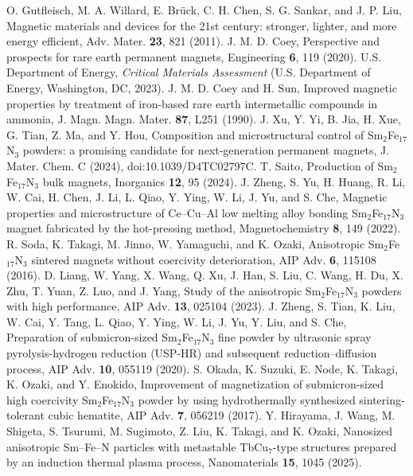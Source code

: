 \documentclass[10pt,twocolumn,letterpaper]{article}
\begin{document}
 O. Gutfleisch, M. A. Willard, E. Br\"uck, C. H. Chen, S. G. Sankar, and J. P. Liu, Magnetic materials and devices for the 21st century: stronger, lighter, and more energy efficient, Adv. Mater. \textbf{23}, 821 (2011).
 J. M. D. Coey, Perspective and prospects for rare earth permanent magnets, Engineering \textbf{6}, 119 (2020).
 U.S. Department of Energy, \textit{Critical Materials Assessment} (U.S. Department of Energy, Washington, DC, 2023).
 J. M. D. Coey and H. Sun, Improved magnetic properties by treatment of iron-based rare earth intermetallic compounds in ammonia, J. Magn. Magn. Mater. \textbf{87}, L251 (1990).
 J. Xu, Y. Yi, B. Jia, H. Xue, G. Tian, Z. Ma, and Y. Hou, Composition and microstructural control of Sm$_2$Fe$_{17}$N$_3$ powders: a promising candidate for next-generation permanent magnets, J. Mater. Chem. C (2024), doi:10.1039/D4TC02797C.
 T. Saito, Production of Sm$_2$Fe$_{17}$N$_3$ bulk magnets, Inorganics \textbf{12}, 95 (2024).
 J. Zheng, S. Yu, H. Huang, R. Li, W. Cai, H. Chen, J. Li, L. Qiao, Y. Ying, W. Li, J. Yu, and S. Che, Magnetic properties and microstructure of Ce--Cu--Al low melting alloy bonding Sm$_2$Fe$_{17}$N$_3$ magnet fabricated by the hot-pressing method, Magnetochemistry \textbf{8}, 149 (2022).
 R. Soda, K. Takagi, M. Jinno, W. Yamaguchi, and K. Ozaki, Anisotropic Sm$_2$Fe$_{17}$N$_3$ sintered magnets without coercivity deterioration, AIP Adv. \textbf{6}, 115108 (2016).
 D. Liang, W. Yang, X. Wang, Q. Xu, J. Han, S. Liu, C. Wang, H. Du, X. Zhu, T. Yuan, Z. Luo, and J. Yang, Study of the anisotropic Sm$_2$Fe$_{17}$N$_3$ powders with high performance, AIP Adv. \textbf{13}, 025104 (2023).
 J. Zheng, S. Tian, K. Liu, W. Cai, Y. Tang, L. Qiao, Y. Ying, W. Li, J. Yu, Y. Liu, and S. Che, Preparation of submicron-sized Sm$_2$Fe$_{17}$N$_3$ fine powder by ultrasonic spray pyrolysis-hydrogen reduction (USP-HR) and subsequent reduction--diffusion process, AIP Adv. \textbf{10}, 055119 (2020).
 S. Okada, K. Suzuki, E. Node, K. Takagi, K. Ozaki, and Y. Enokido, Improvement of magnetization of submicron-sized high coercivity Sm$_2$Fe$_{17}$N$_3$ powder by using hydrothermally synthesized sintering-tolerant cubic hematite, AIP Adv. \textbf{7}, 056219 (2017).
 Y. Hirayama, J. Wang, M. Shigeta, S. Tsurumi, M. Sugimoto, Z. Liu, K. Takagi, and K. Ozaki, Nanosized anisotropic Sm--Fe--N particles with metastable TbCu$_7$-type structures prepared by an induction thermal plasma process, Nanomaterials \textbf{15}, 1045 (2025).
\end{document}
